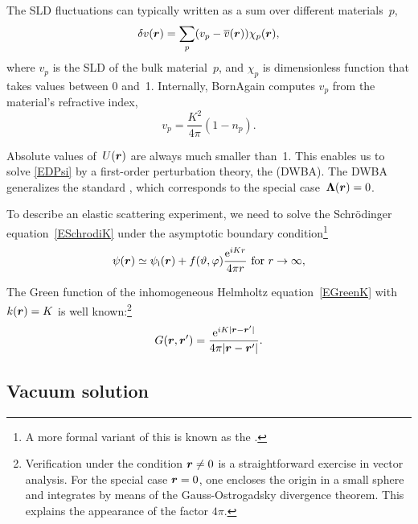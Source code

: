 The SLD fluctuations can typically written as a sum over different materials~$p$,
\begin{equation}
  \delta v(\bm{r}) = \sum_p (v_p-\overline{v}(\bm{r})) \chi_p(\bm{r}),
\end{equation}
where $v_p$ is the SLD of the bulk material~$p$,
and $\chi_p$ is dimensionless function that takes values between 0 and~1.
Internally, BornAgain computes $v_p$ from the material's refractive index,
\begin{equation}
  v_p = \frac{K^2}{4\pi}(1-n_p).
\end{equation}

Absolute values of~$U(\bm{r})$ are always much smaller than~1.
This enables us to solve \cref{EDPsi} by a first-order perturbation theory,
%
the  (DWBA).
%
The DWBA generalizes the standard ,
%
which corresponds to the special case~$\bm{\Lambda}(\bm{r})=0$.

To describe an elastic scattering experiment,
we need to solve the Schrödinger equation~\cref{ESchrodiK}
under the asymptotic boundary condition\footnote
{A more formal variant of this is known as the .%
%
%
}
%
\begin{equation}%
  \psi(\r)
  \simeq \psi_\si(\r) + f(\vartheta,\varphi)\frac{\e^{iKr}}{4\pi r}
  \text{~for~}r\to\infty,
\end{equation}

The Green function of the inhomogeneous Helmholtz equation~\cref{EGreenK}
with $k(\bm{r})=K$ is well known:\footnote
{Verification under the condition $\bm{r}\ne0$
is a straightforward exercise in vector analysis.
For the special case $\bm{r}=0$,
one encloses the origin in a small sphere
and integrates by means of the Gauss-Ostrogadsky divergence theorem.
This explains the appearance of the factor $4\pi$.}
%
\begin{equation}%
  G(\r,\r') = \frac{\e^{iK|\r-\r'|}}{4\pi |\r-\r'|}.
\end{equation}

\subsection{Vacuum solution}%

